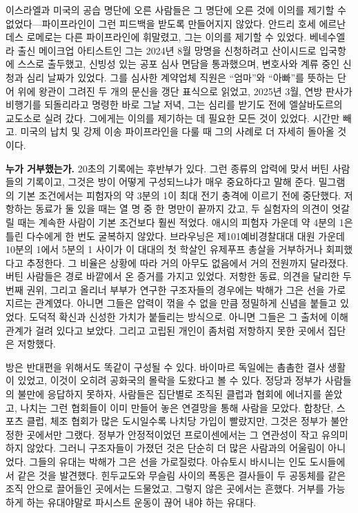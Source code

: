 이스라엘과 미국의 공습 명단에 오른 사람들은 그 명단에 오른 것에 이의를 제기할 수 없었다—파이프라인이 그런 피드백을 받도록 만들어지지 않았다. 안드리 호세 에르난데스 로메로는 다른 파이프라인에 휘말렸고, 그는 이의를 제기할 수 있었다. 베네수엘라 출신 메이크업 아티스트인 그는 2024년 8월 망명을 신청하려고 산이시드로 입국항에 스스로 출두했고, 신빙성 있는 공포 심사 면담을 통과했으며, 변호사와 계류 중인 신청과 심리 날짜가 있었다\autocite{LULAC2025HernandezRomero,Vega2025HernandezRomero}. 그를 심사한 계약업체 직원은 “엄마”와 “아빠”를 뜻하는 단어 위에 왕관이 그려진 두 개의 문신을 갱단 표식으로 읽었고\autocite{Palomera2025Blade}, 2025년 3월, 연방 판사가 비행기를 되돌리라고 명령한 바로 그날 저녁, 그는 심리를 받기도 전에 엘살바도르의 교도소로 실려 갔다\autocite{jgg2025contempt}. 그에게는 이의를 제기하는 데 필요한 모든 것이 있었다. 시간만 빼고. 미국의 납치 및 강제 이송 파이프라인을 다룰 때 그의 사례로 더 자세히 돌아올 것이다.

\textbf{누가 거부했는가.} 20초의 기록에는 후반부가 있다. 그런 종류의 압력에 맞서 버틴 사람들의 기록이고, 그것은 방이 어떻게 구성되느냐가 매우 중요하다고 말해 준다. 밀그램의 기본 조건에서는 피험자의 약 3분의 1이 최대 전기 충격에 이르기 전에 중단했다. 저항하는 동료가 둘 있을 때는 열 명 중 한 명만이 끝까지 갔고, 두 실험자의 의견이 엇갈릴 때는 계속한 사람이 기본 조건보다 훨씬 적었다\autocite{milgram1974obedience}. 애시의 피험자 가운데 약 4분의 1은 틀린 다수에게 한 번도 굴복하지 않았다\autocite{asch1956studies}. 브라우닝은 제101예비경찰대대 대원 가운데 10분의 1에서 5분의 1 사이가 이 대대의 첫 학살인 유제푸프 총살을 거부하거나 회피했다고 추정한다\autocite{browning1992ordinary}. 그 비율은 상황에 따라 거의 아무도 없음에서 거의 전원까지 달라졌다. 버틴 사람들은 경로 바깥에서 온 증거를 가지고 있었다. 저항한 동료, 의견을 달리한 두 번째 권위, 그리고 올리너 부부가 연구한 구조자들의 경우에는 박해가 그은 선을 가로지르는 관계였다\autocite{oliner1988altruistic}. 아니면 그들은 압력이 꺾을 수 없을 만큼 정밀하게 신념을 붙들고 있었다. 도덕적 확신과 신성한 가치가 붙들리는 방식으로\autocite{skitka2009limits,ginges2007sacred}. 아니면 그들은 그 출처에 이해관계가 걸려 있다고 보았다. 그리고 고립된 개인이 좀처럼 저항하지 못한 곳에서 집단은 저항했다\autocite{gamson1982encounters}.

방은 반대편을 위해서도 똑같이 구성될 수 있다. 바이마르 독일에는 촘촘한 결사 생활이 있었고, 이것이 오히려 공화국의 몰락을 도왔다고 볼 수 있다. 정당과 정부가 사람들의 불만에 응답하지 못하자, 사람들은 집단별로 조직된 클럽과 협회에 에너지를 쏟았고, 나치는 그런 협회들이 이미 만들어 놓은 연결망을 통해 사람을 모았다\autocite{berman1997weimar}. 합창단, 스포츠 클럽, 체조 협회가 많은 도시일수록 나치당 가입이 빨랐지만, 그것은 정부가 불안정한 곳에서만 그랬다. 정부가 안정적이었던 프로이센에서는 그 연관성이 작고 유의미하지 않았다\autocite{satyanath2017bowling}. 그러니 구조자들이 가졌던 것은 단순히 더 많은 사람과의 어울림이 아니었다. 그들의 유대는 박해가 그은 선을 가로질렀다. 아슈토시 바시니는 인도 도시들에서 같은 것을 발견했다. 힌두교도와 무슬림 사이의 폭동은 결사들이 두 공동체를 같은 조직 안으로 끌어들인 곳에서는 드물었고, 그렇지 않은 곳에서는 흔했다\autocite{varshney2002ethnic}. 거부를 가능하게 하는 유대야말로 파시스트 운동이 끊어 내야 하는 유대다.

